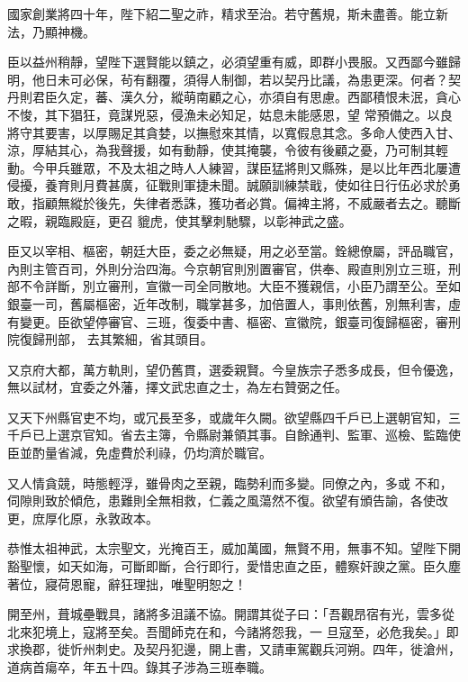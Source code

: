 \begin{pinyinscope}
 國家創業將四十年，陛下紹二聖之祚，精求至治。若守舊規，斯未盡善。能立新法，乃顯神機。



 臣以益州稍靜，望陛下選賢能以鎮之，必須望重有威，即群小畏服。又西鄙今雖歸明，他日未可必保，茍有翻覆，須得人制御，若以契丹比議，為患更深。何者？契丹則君臣久定，蕃、漢久分，縱萌南顧之心，亦須自有思慮。西鄙積恨未泯，貪心不悛，其下猖狂，竟謀兇惡，侵漁未必知足，姑息未能感恩，望
 常預備之。以良將守其要害，以厚賜足其貪婪，以撫慰來其情，以寬假息其念。多命人使西入甘、涼，厚結其心，為我聲援，如有動靜，使其掩襲，令彼有後顧之憂，乃可制其輕動。今甲兵雖眾，不及太祖之時人人練習，謀臣猛將則又縣殊，是以比年西北屢遭侵擾，養育則月費甚廣，征戰則軍捷未聞。誠願訓練禁戢，使如往日行伍必求於勇敢，指顧無縱於後先，失律者悉誅，獲功者必賞。偏裨主將，不威嚴者去之。聽斷之暇，親臨殿庭，更召
 貔虎，使其擊刺馳驟，以彰神武之盛。



 臣又以宰相、樞密，朝廷大臣，委之必無疑，用之必至當。銓總僚屬，評品職官，內則主管百司，外則分治四海。今京朝官則別置審官，供奉、殿直則別立三班，刑部不令詳斷，別立審刑，宣徽一司全同散地。大臣不獲親信，小臣乃謂至公。至如銀臺一司，舊屬樞密，近年改制，職掌甚多，加倍置人，事則依舊，別無利害，虛有變更。臣欲望停審官、三班，復委中書、樞密、宣徽院，銀臺司復歸樞密，審刑院復歸刑部，
 去其繁細，省其頭目。



 又京府大都，萬方軌則，望仍舊貫，選委親賢。今皇族宗子悉多成長，但令優逸，無以試材，宜委之外藩，擇文武忠直之士，為左右贊弼之任。



 又天下州縣官吏不均，或冗長至多，或歲年久闕。欲望縣四千戶已上選朝官知，三千戶已上選京官知。省去主簿，令縣尉兼領其事。自餘通判、監軍、巡檢、監臨使臣並酌量省減，免虛費於利祿，仍均濟於職官。



 又人情貪競，時態輕浮，雖骨肉之至親，臨勢利而多變。同僚之內，多或
 不和，伺隙則致於傾危，患難則全無相救，仁義之風蕩然不復。欲望有頒告諭，各使改更，庶厚化原，永敦政本。



 恭惟太祖神武，太宗聖文，光掩百王，威加萬國，無賢不用，無事不知。望陛下開豁聖懷，如天如海，可斷即斷，合行即行，愛惜忠直之臣，體察奸諛之黨。臣久塵著位，寢荷恩寵，辭狂理拙，唯聖明恕之！



 開至州，葺城壘戰具，諸將多沮議不協。開謂其從子曰：「吾觀昂宿有光，雲多從北來犯境上，寇將至矣。吾聞師克在和，今諸將怨我，一
 旦寇至，必危我矣。」即求換郡，徙忻州刺史。及契丹犯邊，開上書，又請車駕觀兵河朔。四年，徙滄州，道病首瘍卒，年五十四。錄其子涉為三班奉職。




\end{pinyinscope}
